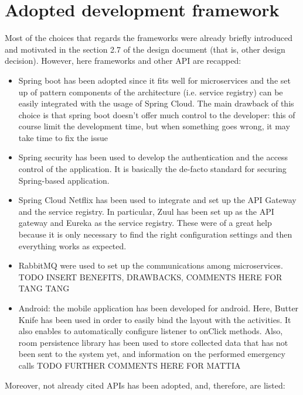 \section{Adopted development framework}
Most of the choices that regards the frameworks were already briefly introduced and motivated in the
section 2.7 of the design document (that is, other design decision). 
However, here frameworks and other API are recapped:

\begin{itemize}

\item Spring boot has been adopted since it fits well for microservices and the set up of pattern components
of the architecture (i.e. service registry) can be easily integrated with the usage of Spring Cloud.
The main drawback of this choice is that spring boot doesn't offer much control to the developer: this of
course limit the development time, but when something goes wrong, it may take time to fix the issue

\item Spring security has been used to develop the authentication and the access control of the application.
It is basically the de-facto standard for securing Spring-based application. 

\item Spring Cloud Netflix has been used to integrate and set up the API Gateway and the service registry.
In particular, Zuul has been set up as the API gateway and Eureka as the service registry. 
These were of a great help because it is only necessary to find the right configuration settings and then everything works as expected.

\item RabbitMQ were used to set up the communications among microservices. 
TODO INSERT BENEFITS, DRAWBACKS, COMMENTS HERE FOR TANG TANG

\item Android: the mobile application has been developed for android. Here, Butter Knife has been used in order to easily bind the layout with the activities. It also enables to automatically configure listener to onClick methods. Also, room persistence library has been used to store
collected data that has not been sent to the system yet, and information on the performed emergency calls
TODO FURTHER COMMENTS HERE FOR MATTIA

\end{itemize}

Moreover, not already cited APIs has been adopted, and, therefore, are listed: 

